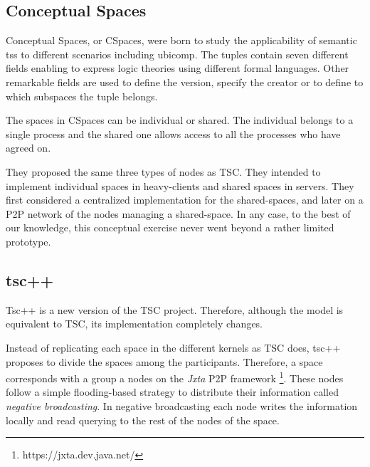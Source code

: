 \subsection{Conceptual Spaces}

Conceptual Spaces, or CSpaces, were born to study the applicability of semantic \aclp{ts} to different scenarios including \acl{ubicomp}.
The tuples contain seven different fields enabling to express logic theories using different formal languages.
Other remarkable fields are used to define the version, specify the creator or to define to which subspaces the tuple belongs. %

The spaces in CSpaces can be individual or shared.
The individual belongs to a single process and the shared one allows access to all the processes who have agreed on.

They proposed the same three types of nodes as TSC.
They intended to implement individual spaces in heavy-clients and shared spaces in servers.
They first considered a centralized implementation for the shared-spaces, %
and later on a P2P network of the nodes managing a shared-space. %
In any case, to the best of our knowledge, this conceptual exercise never went beyond a rather limited prototype.



\subsection{tsc++}

Tsc++ \citep{krummenacher_open_2009} is a new version of the TSC project.
Therefore, although the model is equivalent to TSC, its implementation completely changes.


Instead of replicating each space in the different kernels as TSC does, tsc++ proposes to divide the spaces among the participants.
Therefore, a space corresponds with a group a nodes on the \emph{Jxta} P2P framework \footnote{https://jxta.dev.java.net/}. %
These nodes follow a simple flooding-based strategy to distribute their information called \emph{negative broadcasting}.
In negative broadcasting each node writes the information locally and read querying to the rest of the nodes of the space.


